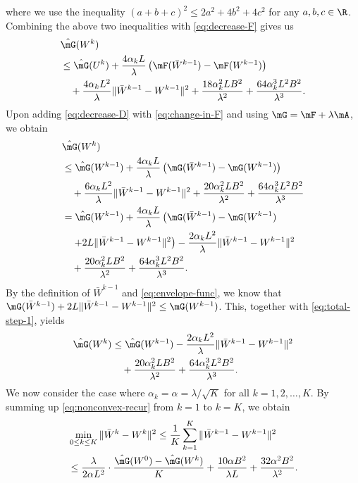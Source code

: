 where we use the inequality $(a+b+c)^2\leq 2a^2 + 4b^2 + 4c^2$ for any $a,b,c\in\R$. Combining the above two inequalities with \eqref{eq:decrease-F} gives us
\begin{equation}
\label{eq:change-in-F}
\begin{aligned}
& \hat{\mG}(W^k) \\
& \leq \hat{\mG}(U^k) + \frac{4\alpha_kL}{\lambda}\left(\mF(\bar{W}^{k-1}) - \mF(W^{k-1})\right) \\
& \quad + \frac{4\alpha_kL^2}{\lambda}\|\bar{W}^{k-1} - W^{k-1}\|^2 + \frac{18\alpha_k^2LB^2}{\lambda^2} + \frac{64\alpha_k^3L^2B^2}{\lambda^3}.
\end{aligned}
\end{equation}
Upon adding \eqref{eq:decrease-D} with \eqref{eq:change-in-F} and using $\mG = \mF + \lambda \mA$, we obtain
\begin{equation}\label{eq:total-step-1}
\begin{aligned}
& \hat{\mG}(W^k) \\
& \leq \hat{\mG}(W^{k-1}) + \frac{4\alpha_kL}{\lambda}\left(\mG(\bar{W}^{k-1}) - \mG(W^{k-1})\right) \\
& \quad + \frac{6\alpha_kL^2}{\lambda}\|\bar{W}^{k-1} - W^{k-1}\|^2 + \frac{20\alpha_k^2LB^2}{\lambda^2} + \frac{64\alpha_k^3L^2B^2}{\lambda^3} \\
& = \hat{\mG}(W^{k-1}) + \frac{4\alpha_kL}{\lambda}\left(\mG(\bar{W}^{k-1}) - \mG(W^{k-1}) \right. \\
& \quad \left. + 2L\|\bar{W}^{k-1} - W^{k-1}\|^2\right) - \frac{2\alpha_kL^2}{\lambda}\|\bar{W}^{k-1} - W^{k-1}\|^2 \\
& \quad + \frac{20\alpha_k^2LB^2}{\lambda^2} + \frac{64\alpha_k^3L^2B^2}{\lambda^3}.
\end{aligned}
\end{equation}
By the definition of $\bar{W}^{k-1}$ and \eqref{eq:envelope-func}, we know that $\mG(\bar{W}^{k-1}) + 2L\|\bar{W}^{k-1} - W^{k-1}\|^2 \leq \mG(W^{k-1})$. This, together with \eqref{eq:total-step-1}, yields
\begin{equation}
\label{eq:nonconvex-recur}
\begin{aligned}
\hat{\mG}(W^k) & \leq \hat{\mG}(W^{k-1}) - \frac{2\alpha_kL^2}{\lambda}\|\bar{W}^{k-1} - W^{k-1}\|^2 \\
& \quad + \frac{20\alpha_k^2LB^2}{\lambda^2} + \frac{64\alpha_k^3L^2B^2}{\lambda^3}.
\end{aligned} 
\end{equation}
We now consider the case where $\alpha_k = \alpha = \lambda/\sqrt{K}$ for all $k=1,2,\dots,K$. By summing up \eqref{eq:nonconvex-recur} from $k=1$ to $k=K$, we obtain
\begin{equation}
\label{eq:after-sum}
\begin{aligned}
& \min_{0\leq k\leq K} \|\bar{W}^k - W^k\|^2 \leq 
\frac{1}{K}\sum_{k=1}^K \|\bar{W}^{k-1} - W^{k-1}\|^2 \\
& \leq \frac{\lambda}{2\alpha L^2}\cdot\frac{\hat{\mG}(W^0) - \hat{\mG}(W^k)}{K} + \frac{10\alpha B^2}{\lambda L} + \frac{32\alpha^2B^2}{\lambda^2}. 
\end{aligned}
\end{equation}

